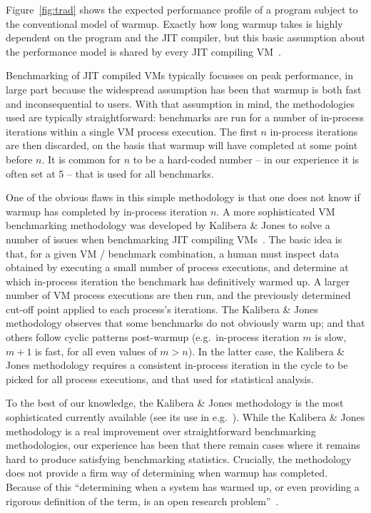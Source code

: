 \documentclass[a4paper,UKenglish]{lipics}
\newcommand{\kalibera}{Kalibera \& Jones\xspace}
\begin{document}
Figure~\ref{fig:trad} shows the expected performance profile of a
program subject to the conventional model of warmup. Exactly how long warmup
takes is highly dependent on
the program and the JIT compiler, but this basic assumption about the
performance model is shared by every JIT compiling
VM~\cite{kalibera13rigorous}.

Benchmarking of JIT compiled VMs typically focusses on peak
performance, in large part because the widespread assumption has been that
warmup is both fast and inconsequential to users. With that assumption in mind, the
methodologies used are typically straightforward: benchmarks are run for a number
of in-process iterations within a single VM process execution.
The first $n$ in-process iterations are then discarded, on the basis that warmup
will have completed at some point before $n$. It is common for
$n$ to be a hard-coded number -- in our experience it is often set at 5 --
that is used for all benchmarks.

One of the obvious flaws in this simple methodology is that one does not know if warmup
has completed by in-process iteration $n$. A more sophisticated VM benchmarking methodology
was developed by \kalibera to solve a number of issues when benchmarking JIT
compiling VMs~\cite{kalibera12quantifying,kalibera13rigorous}. The basic idea is
that, for a given VM / benchmark combination, a human must inspect data obtained by
executing a small number of process executions, and determine at which in-process iteration the
benchmark has definitively warmed up. A larger number of VM process executions are then
run, and the previously determined cut-off point applied to each process's
iterations. The \kalibera methodology observes that some benchmarks do not
obviously warm up; and that others follow cyclic patterns post-warmup
(e.g.~in-process iteration $m$ is slow, $m+1$ is fast, for all even values of $m > n$). In
the latter case, the \kalibera methodology requires a consistent in-process iteration in
the cycle to be picked for all process executions, and that used for statistical analysis.

To the best of our knowledge, the \kalibera methodology is the most
sophisticated currently available (see its use in
e.g.~\cite{barrett15approaches,grimmer15dynamically}). While the \kalibera
methodology is a real improvement over straightforward benchmarking methodologies,
our experience has been that there remain cases where it remains hard to produce
satisfying benchmarking statistics. Crucially, the methodology does not
provide a firm way of determining when warmup has completed. Because of this
``determining when a system has warmed up, or even providing a
rigorous definition of the term, is an open research problem''~\cite{seaton15phd}.
\end{document}

